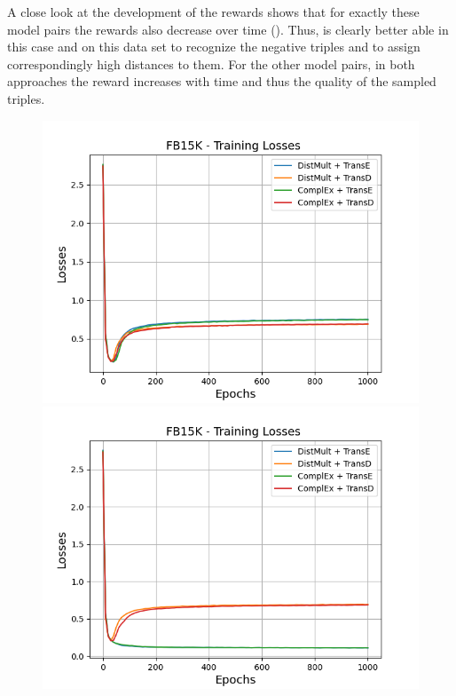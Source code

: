 A close look at the development of the rewards shows that for exactly these model pairs the rewards also decrease over time ().
Thus, \transe is clearly better able in this case and on this data set to recognize the negative triples and to assign correspondingly high distances to them.
For the other model pairs, in both approaches the reward increases with time and thus the quality of the sampled triples.
\begin{figure}[H]
    \centering
    \begin{minipage}{.5\textwidth}
      \centering
      \includegraphics[width=0.9\linewidth]{figures/results/gan_train/not_pretrained/random/fb15k/1k_epochs/random_fb15k_losses.png}
    \end{minipage}%
    \begin{minipage}{.5\textwidth}
      \centering
      \includegraphics[width=0.9\linewidth]{figures/results/gan_train/not_pretrained/uncertainty/max_distribution/entropy/fb15k/1k_epochs/uncertainty_fb15k_losses.png}

\end{minipage}
\end{figure}
